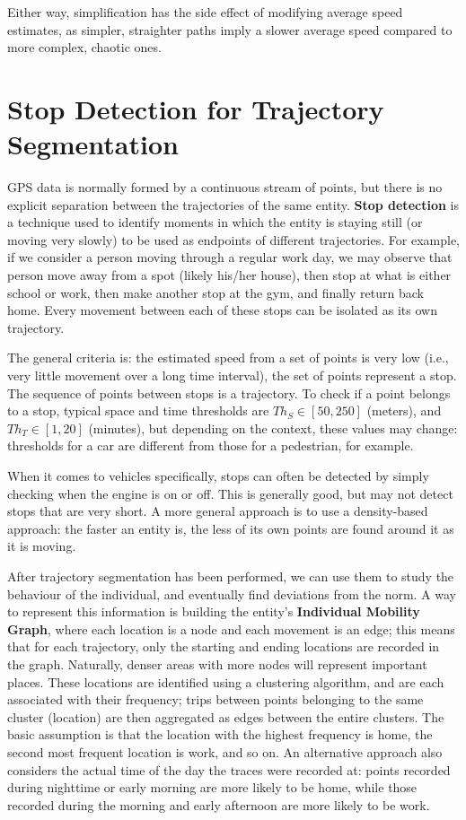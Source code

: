 Either way, simplification has the side effect of modifying average speed estimates, as simpler, straighter paths imply a slower average speed compared to more complex, chaotic ones.

\section{Stop Detection for Trajectory Segmentation}

GPS data is normally formed by a continuous stream of points, but there is no explicit separation between the trajectories of the same entity. \textbf{Stop detection} is a technique used to identify moments in which the entity is staying still (or moving very slowly) to be used as endpoints of different trajectories. For example, if we consider a person moving through a regular work day, we may observe that person move away from a spot (likely his/her house), then stop at what is either school or work, then make another stop at the gym, and finally return back home. Every movement between each of these stops can be isolated as its own trajectory.

The general criteria is: the estimated speed from a set of points is very low (i.e., very little movement over a long time interval), the set of points represent a stop. The sequence of points between stops is a trajectory. To check if a point belongs to a stop, typical space and time thresholds are $Th_S \in [50, 250]$ (meters), and $Th_T \in [1, 20]$ (minutes), but depending on the context, these values may change: thresholds for a car are different from those for a pedestrian, for example.

When it comes to vehicles specifically, stops can often be detected by simply checking when the engine is on or off. This is generally good, but may not detect stops that are very short. A more general approach is to use a density-based approach: the faster an entity is, the less of its own points are found around it as it is moving. 

After trajectory segmentation has been performed, we can use them to study the behaviour of the individual, and eventually find deviations from the norm. A way to represent this information is building the entity's \textbf{Individual Mobility Graph}, where each location is a node and each movement is an edge; this means that for each trajectory, only the starting and ending locations are recorded in the graph. Naturally, denser areas with more nodes will represent important places. These locations are identified using a clustering algorithm, and are each associated with their frequency; trips between points belonging to the same cluster (location) are then aggregated as edges between the entire clusters. The basic assumption is that the location with the highest frequency is home, the second most frequent location is work, and so on. An alternative approach also considers the actual time of the day the traces were recorded at: points recorded during nighttime or early morning are more likely to be home, while those recorded during the morning and early afternoon are more likely to be work.

